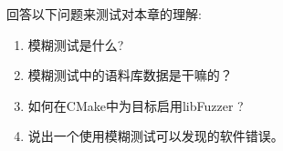 回答以下问题来测试对本章的理解:

\begin{enumerate}
\item 
模糊测试是什么?

\item 
模糊测试中的语料库数据是干嘛的？

\item 
如何在CMake中为目标启用libFuzzer ?

\item 
说出一个使用模糊测试可以发现的软件错误。
\end{enumerate}